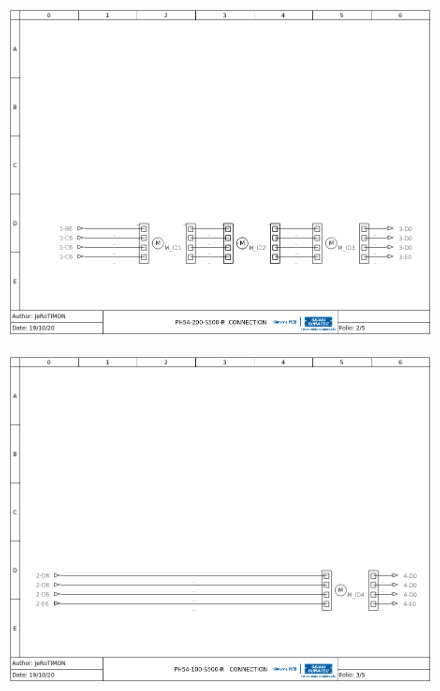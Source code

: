 \documentclass[
12pt,					%
openright,				%
twoside,				%
a4paper,				%
english,
brazil
]{ABNT/abntex2_report}
\begin{document}
	\begin{figure}[H]
		\centering
		\includegraphics[scale=0.72]{appendix/connection_2.png}
		\label{fig:connection2}
	\end{figure}

	\begin{figure}[H]
		\centering
		\includegraphics[scale=0.72]{appendix/connection_3.png}
		\label{fig:connection3}
	\end{figure}
\end{document}
